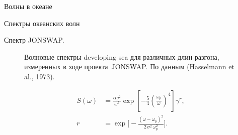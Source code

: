 \begin{chapter}{Волны в океане}
\begin{section}{Спектры океанских волн}
\begin{paragraph}{Спектр JONSWAP.}
\begin{figure}[t!]
\caption{Волновые спектры developing sea для различных длин разгона,
измеренных в ходе проекта~JONSWAP. По данным (Hasselmann et al., 1973).}
\label{fig:hasselmannspect}
\end{figure}
%
%
%

\begin{subequations}\label{eq:16.34}
\begin{align}
 S(\omega) &= \frac{\alpha g^{2}}{\omega ^{5}} 
              \exp \left[ - \frac{5}{4}\left(\frac{\omega _{p}}{\omega } \right) ^{4} \right] \gamma ^{r}, \\
         r &= \exp \biggl[ - \frac{\left(\omega - \omega _{p}\right)^{2}}{2\, \sigma ^{2} \,\omega _{p}^{2}}\biggr].
\end{align}
\end{subequations}


\end{paragraph}
\end{section}
\end{chapter}
